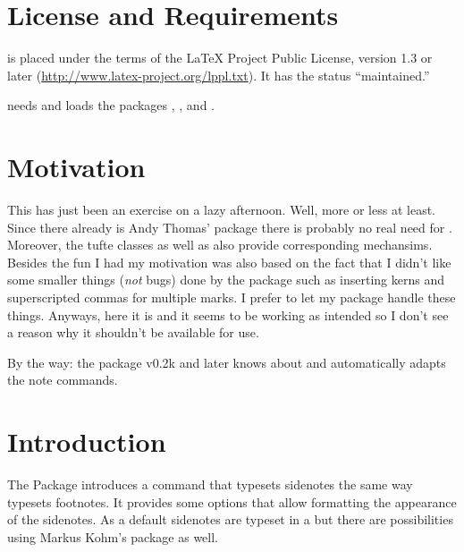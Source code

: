 \documentclass[toc=index,toc=bib,mpinclude]{cnpkgdoc}
\makeatletter
\newcommand*\defaultsidenotes{%
  \setsidenotes{
    note-mark-format = \@textsuperscript{\normalfont##1},
    text-format      = \footnotesize
  }}
\makeatother
\begin{document}
\section{License and Requirements}\label{sec:license}
\snotez is placed under the terms of the \LaTeX{} Project Public License,
version 1.3 or later (\url{http://www.latex-project.org/lppl.txt}). It has the
status ``maintained.''

\snotez needs and loads the packages
,
,
 and
.

\section{Motivation}
This has just been an exercise on a lazy
afternoon.
Well, more or less at least. Since there already is Andy Thomas' 
package there is probably
no real need for \snotez. Moreover, the tufte classes
as well as  also provide corresponding
mechansims. Besides the fun I had my motivation was also based on the fact that
I didn't like some smaller things (\emph{not} bugs) done by the 
package such as inserting kerns and superscripted commas for multiple marks. I
prefer to let my  package handle
these things. Anyways, here it is and it seems to be working as intended so I
don't see a reason why it shouldn't be available for use.

By the way: the  package v0.2k and later knows about \snotez and
automatically adapts the note commands.

\section{Introduction}
The \snotez Package introduces a  command%
\begingroup\defaultsidenotes
{}
\endgroup
that typesets sidenotes the
same way  typesets footnotes. It provides some options that allow
formatting the appearance of the sidenotes. As a default sidenotes are typeset in a  but
there are possibilities using Markus Kohm's  package as well.
\end{document}
